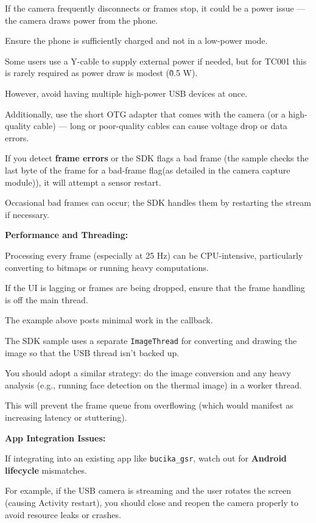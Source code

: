 {If the camera frequently disconnects or frames stop, it could be a power issue
--- the camera draws power from the phone.

Ensure the phone is sufficiently charged and not in a low-power mode.

Some users use a Y-cable to supply external power if needed, but for TC001 this
is rarely required as power draw is modest (\~0.5 W).

However, avoid having multiple high-power USB devices at once.

Additionally, use the short OTG adapter that comes with the camera (or a
high-quality cable) --- long or poor-quality cables can cause voltage drop or
data errors.

If you detect \textbf{frame errors}
or the SDK flags a bad frame (the sample checks the last byte of the frame for a
bad-frame flag(as detailed in the camera capture module)), it will attempt a
sensor restart.

Occasional bad frames can occur; the SDK handles them by restarting the stream
if necessary.

\item \textbf{Performance and Threading:}

Processing every frame (especially at 25 Hz) can be CPU-intensive, particularly
converting to bitmaps or running heavy computations.

If the UI is lagging or frames are being dropped, ensure that the frame handling
is off the main thread.

The example above posts minimal work in the callback.

The SDK sample uses a separate \texttt{ImageThread} for converting and drawing
the image so that the USB thread isn't backed up.

You should adopt a similar strategy: do the image conversion and any heavy
analysis (e.g., running face detection on the thermal image) in a worker thread.

This will prevent the frame queue from overflowing (which would manifest as
increasing latency or stuttering).

\item \textbf{App Integration Issues:}

If integrating into an existing app like \texttt{bucika_gsr}, watch out for \textbf{Android lifecycle}
 mismatches.

For example, if the USB camera is streaming and the user rotates the screen
(causing Activity restart), you should close and reopen the camera properly to
avoid resource leaks or crashes.

}
